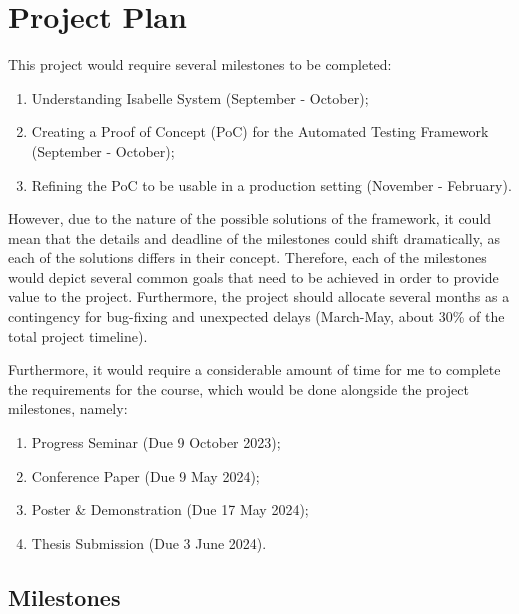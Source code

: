 \section{Project Plan}

This project would require several milestones to be completed:
\begin{enumerate}
    \item Understanding Isabelle System (September - October);
    \item Creating a Proof of Concept (PoC) for the Automated Testing Framework (September - October);
    \item Refining the PoC to be usable in a production setting (November - February).
\end{enumerate}

However, due to the nature of the possible solutions of the framework, it could mean that the details and deadline 
of the milestones could shift dramatically, as each of the solutions differs in their concept. Therefore, 
each of the milestones would depict several common goals that need to be achieved in order to 
provide value to the project. Furthermore, the project should allocate several months as a contingency for 
bug-fixing and unexpected delays (March-May, about 30\% of the total project timeline).

Furthermore, it would require a considerable amount of time for me to complete the requirements for the course,
which would be done alongside the project milestones, namely:
\begin{enumerate}
    \item Progress Seminar (Due 9 October 2023);
    \item Conference Paper (Due 9 May 2024);
    \item Poster \& Demonstration (Due 17 May 2024);
    \item Thesis Submission (Due 3 June 2024).
\end{enumerate}

\subsection{Milestones}
\label{sec:Milestones}


